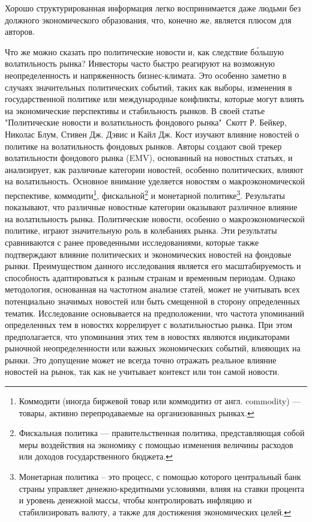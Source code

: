 \documentclass[14pt]{extarticle}
\begin{document}
Хорошо структурированная информация легко воспринимается даже людьми без должного экономического образования, что, конечно же, является плюсом для авторов.

Что же можно сказать про политические новости и, как следствие б\'{о}льшую волатильность рынка? Инвесторы часто быстро реагируют на возможную неопределенность и напряженность бизнес-климата. Это особенно заметно в случаях значительных политических событий, таких как выборы, изменения в государственной политике или международные конфликты, которые могут влиять на экономические перспективы и стабильность рынков. В своей статье "Политические новости и волатильность фондового рынка"\cite{NBERw25720}\ Скотт Р. Бейкер, Николас Блум, Стивен Дж. Дэвис и Кайл Дж. Кост изучают влияние новостей о политике на волатильность фондовых рынков. Авторы создают свой трекер волатильности фондового рынка (EMV), основанный на новостных статьях, и анализирует, как различные категории новостей, особенно политических, влияют на волатильность. Основное внимание уделяется новостям о макроэкономической перспективе, коммодити\footnote{Коммодити (иногда биржевой товар или коммодитиз от англ. commodity) — товары, активно перепродаваемые на организованных рынках. }, фискальной\footnote{Фискальная политика — правительственная политика, представляющая собой меры воздействия на экономику с помощью изменения величины расходов или доходов государственного бюджета.} и монетарной политике\footnote{Монетарная политика – это процесс, с помощью которого центральный банк страны управляет денежно-кредитными условиями, влияя на ставки процента и уровень денежной массы, чтобы контролировать инфляцию и стабилизировать валюту, а также для достижения экономических целей.}.
Результаты показывают, что различные новостные категории оказывают различное влияние на волатильность рынка. Политические новости, особенно о макроэкономической политике, играют значительную роль в колебаниях рынка. Эти результаты сравниваются с ранее проведенными исследованиями, которые также подтверждают влияние политических и экономических новостей на фондовые рынки. Преимуществом данного исследования является его масштабируемость и способность адаптироваться к разным странам и временным периодам. Однако методология, основанная на частотном анализе статей, может не учитывать всех потенциально значимых новостей или быть смещенной в сторону определенных тематик. Исследование основывается на предположении, что частота упоминаний определенных тем в новостях коррелирует с волатильностью рынка. При этом предполагается, что упоминания этих тем в новостях являются индикаторами рыночной неопределенности или важных экономических событий, влияющих на рынки. Это допущение может не всегда точно отражать реальное влияние новостей на рынок, так как не учитывает контекст или тон самой новости.
\end{document}
